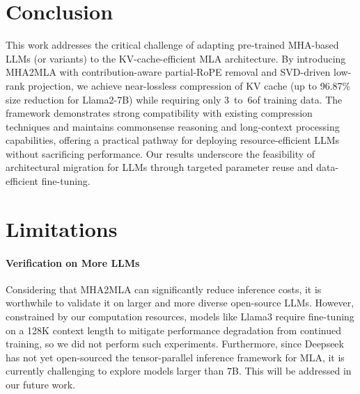 





\section{Conclusion}  
This work addresses the critical challenge of adapting pre-trained MHA-based LLMs (or variants) to the KV-cache-efficient MLA architecture. By introducing MHA2MLA with contribution-aware partial-RoPE removal and SVD-driven low-rank projection, we achieve near-lossless compression of KV cache (up to 96.87\% size reduction for Llama2-7B) while requiring only 3\textperthousand~to~6\textperthousand of training data. The framework demonstrates strong compatibility with existing compression techniques and maintains commonsense reasoning and long-context processing capabilities, offering a practical pathway for deploying resource-efficient LLMs without sacrificing performance. Our results underscore the feasibility of architectural migration for LLMs through targeted parameter reuse and data-efficient fine-tuning.

\section*{Limitations}  

\paragraph{Verification on More LLMs}  
Considering that MHA2MLA can significantly reduce inference costs, it is worthwhile to validate it on larger and more diverse open-source LLMs. However, constrained by our computation resources, models like Llama3 require fine-tuning on a 128K context length to mitigate performance degradation from continued training, so we did not perform such experiments. Furthermore, since Deepseek has not yet open-sourced the tensor-parallel inference framework for MLA, it is currently challenging to explore models larger than 7B. This will be addressed in our future work.

